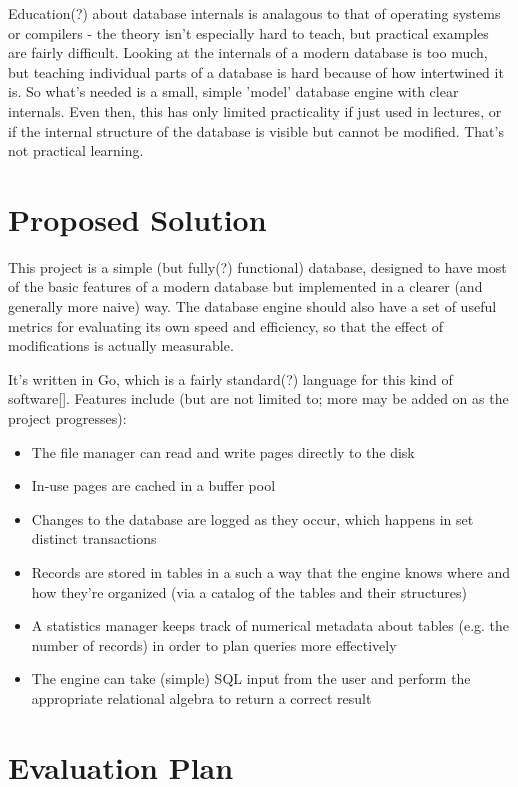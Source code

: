 \documentclass[12pt, oneside]{amsart} %
\begin{document}
Education(?) about database internals is analagous to that of operating systems or compilers - the theory isn't especially hard to teach, but practical examples are fairly difficult. Looking at the internals of a modern database is too much, but teaching individual parts of a database is hard because of how intertwined it is. So what's needed is a small, simple 'model' database engine with clear internals. Even then, this has only limited practicality if just used in lectures, or if the internal structure of the database is visible but cannot be modified. That's not practical learning. 

\section{Proposed Solution}

This project is a simple (but fully(?) functional) database, designed to have most of the basic features of a modern database but implemented in a clearer (and generally more naive) way. The database engine should also have a set of useful metrics for evaluating its own speed and efficiency, so that the effect of modifications is actually measurable. 

It's written in Go, which is a fairly standard(?) language for this kind of software[]. Features include (but are not limited to; more may be added on as the project progresses):
\begin{itemize}
    \item The file manager can read and write pages directly to the disk
    \item In-use pages are cached in a buffer pool 
    \item Changes to the database are logged as they occur, which happens in set distinct transactions
    \item Records are stored in tables in a such a way that the engine knows where and how they're organized (via a catalog of the tables and their structures)
    \item A statistics manager keeps track of numerical metadata about tables (e.g. the number of records) in order to plan queries more effectively 
    \item The engine can take (simple) SQL input from the user and perform the appropriate relational algebra to return a correct result
\end{itemize}



\section{Evaluation Plan}
\end{document}
